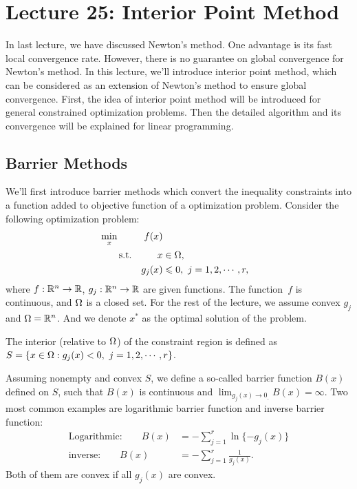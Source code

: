 \section{Lecture 25: Interior Point Method}
In last lecture, we have discussed Newton's method. One advantage is its fast local convergence rate. However, there is no guarantee on global convergence for Newton's method. In this lecture, we'll introduce interior point method, which can be considered as an extension of Newton's method to ensure global convergence. First, the idea of interior point method will be introduced for general constrained optimization problems. Then the detailed algorithm and its convergence will be explained for linear programming. 
\subsection{Barrier Methods}
We'll first introduce barrier methods which convert the inequality constraints into a function added to objective function of a optimization problem. Consider the following optimization problem: 
\begin{equation}
\begin{aligned}
&\min_x & {f(x)}\\
&\qquad\text{s.t.} &x&\in{\Omega},\\
& &g_j(x)&\leqslant{0},\ j=1,2,\cdots,r,\\
\end{aligned}
\end{equation}
where $f:\mathbb{R}^n\rightarrow\mathbb{R}$, $g_j:\mathbb{R}^n\rightarrow\mathbb{R}$ are given functions. The function~$f$ is continuous, and $\Omega$ is a closed set. For the rest of the lecture, we assume convex $g_j$ and $\Omega=\mathbb{R}^n$. And we denote $x^*$ as the optimal solution of the problem.

\begin{definition}
The interior (relative to $\Omega$) of the constraint region is defined as $S=\{x\in\domain:g_j(x)<0,\ j=1,2,\cdots,r\}$. 
\end{definition}

Assuming nonempty and convex $S$, we define a so-called barrier function $B(x)$ defined on $S$, such that $B(x)$ is continuous and $\lim_{g_j(x)\rightarrow{0_{\_}}}B(x)=\infty$. Two most common examples are logarithmic barrier function and inverse barrier function: 
\begin{align}
\text{Logarithmic:}\qquad B(x) &= -\sum_{j=1}^{r}\ln\{-g_j(x)\}\\
\text{inverse:}\qquad B(x) &= -\sum_{j=1}^{r}\frac{1}{g_j(x)}.
\end{align}
Both of them are convex if all $g_j(x)$ are convex. 

